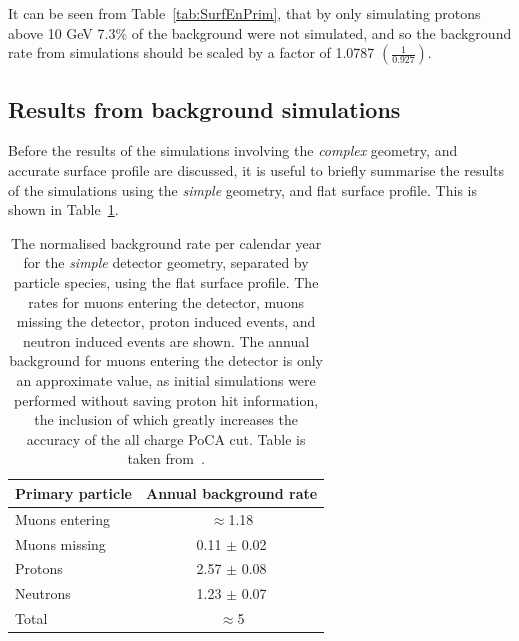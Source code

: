 It can be seen from Table~\ref{tab:SurfEnPrim}, that by only simulating protons above 10 GeV 7.3\% of the background were not simulated, and so the background rate from simulations should be scaled by a factor of 1.0787 $\left(\frac{1}{0.927}\right)$. \\

\subsection{Results from background simulations}
Before the results of the simulations involving the \emph{complex} geometry, and accurate surface profile are discussed, it is useful to briefly summarise the results of the simulations using the \emph{simple} geometry, and flat surface profile. This is shown in Table~\ref{tab:SimpSurfRates}. \\
\begin{table}
  \caption[The normalised background rate per calendar year for the \emph{simple} detector geometry, using the flat surface profile]
          {The normalised background rate per calendar year for the \emph{simple} detector geometry, separated by particle species, using the flat surface profile. The rates for muons entering the detector, muons missing the detector, proton induced events, and neutron induced events are shown. The annual background for muons entering the detector is only an approximate value, as initial simulations were performed without saving proton hit information, the inclusion of which greatly increases the accuracy of the all charge PoCA cut. Table is taken from~\citep{MartinsThesis}.}
  \centering
  \label{tab:SimpSurfRates}
  \begin{tabular}{l c}
    \toprule
        {Primary particle} & {Annual background rate}  \\ 
        \midrule
        Muons entering     & $\approx$1.18             \\

        Muons missing      & 0.11 $\pm$ 0.02           \\

        Protons            & 2.57 $\pm$ 0.08           \\

        Neutrons           & 1.23 $\pm$ 0.07           \\

        Total              & $\approx$5                \\
    \bottomrule
  \end{tabular}
\end{table}

